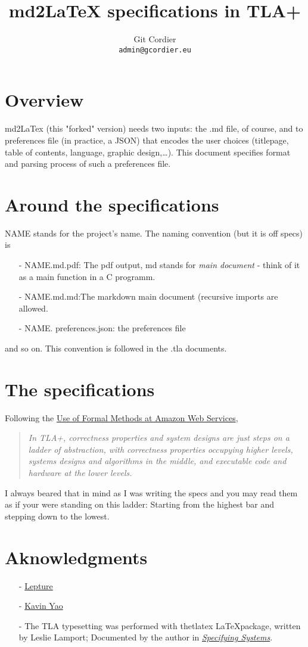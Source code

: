 \documentclass[a4paper, 11pt, titlepage, openany]{article}
\title{md2LaTeX specifications in TLA+}
\author{Git Cordier \\\texttt{admin@gcordier.eu}}\setlength\parindent{0pt}
\begin{document}

\maketitle
\tableofcontents\newpage
\section{Overview}
md2LaTex (this "forked" version) needs two inputs: the {\fw .md} file, 
of course, and to preferences file (in practice, a JSON) that encodes the user
choices (titlepage, table of contents, language, graphic design,…).
This document specifies format and parsing process of such a preferences file. 
\section{Around the specifications}
NAME stands for the project's name. The naming convention (but it is off specs) is                      
\begin{itemize}
  \item[-]{NAME.md.pdf: The pdf output, md stands for \textit{main document} - 
    think of it as a main function in a C programm. }
  \item[-]{NAME.md.md:The markdown main document (recursive imports are allowed.}
  \item[-]{NAME. preferences.json: the preferences file}
\end{itemize}
and so on. This convention is followed in the {\fw .tla} documents.
\section{The specifications}
Following the \href{https://lamport.azurewebsites.net/tla/formal-methods-amazon.pdf}{Use of Formal Methods at Amazon Web Services}, 
\begin{quote}
    \textit{In TLA+, correctness properties and system designs are just steps on a ladder of abstraction, 
    with correctness properties occupying higher levels,
    systems designs and algorithms in the middle, 
    and executable code and hardware at the lower levels.}
\end{quote}
I always beared that in mind as I was writing the specs and you may read them as if your were standing on this ladder: 
Starting from the highest bar and stepping down to the lowest. 

\newpage
\section{Aknowledgments} 
\begin{itemize}
  \item[-]{\href{https://github.com/lepture/mistune}{Lepture}}
  \item[-]{\href{https://github.com/kavinyao/md2latex}{Kavin Yao}}
  \item[-]{The TLA typesetting was performed with the{\fw tlatex} \LaTeX package, written by Leslie Lamport;
          Documented by the author in 
          \href{https://lamport.azurewebsites.net/tla/book.html}{\textit{Specifying Systems}}.
  }
\end{itemize}
\end{document}
